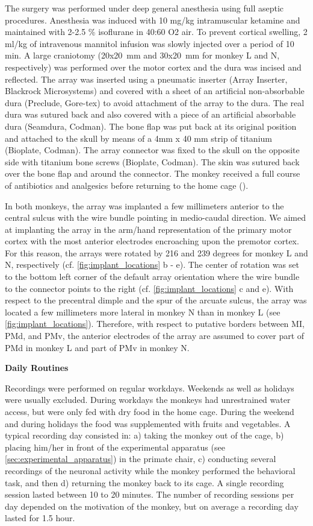 {The surgery was performed under deep general anesthesia using full aseptic procedures. Anesthesia was induced with 10 mg/kg intramuscular ketamine and maintained with 2-2.5 \% isoflurane in 40:60 O2 air. To prevent cortical swelling, 2 ml/kg of intravenous mannitol infusion was slowly injected over a period of 10 min. A large craniotomy (20x20 mm and 30x20 mm for monkey L and N, respectively) was performed over the motor cortex and the dura was incised and reflected. The array was inserted using a pneumatic inserter (Array Inserter, Blackrock Microsystems) and covered with a sheet of an artificial non-absorbable dura (Preclude, Gore-tex) to avoid attachment of the array to the dura. The real dura was sutured back and also covered with a piece of an artificial absorbable dura (Seamdura, Codman). The bone flap was put back at its original position and attached to the skull by means of a 4mm x 40 mm strip of titanium (Bioplate, Codman). The array connector was fixed to the skull on the opposite side with titanium bone screws (Bioplate, Codman). The skin was sutured back over the bone flap and around the connector. The monkey received a full course of antibiotics and analgesics before returning to the home cage (\cite{Riehle_2013}).

In both monkeys, the array was implanted a few millimeters anterior to the central sulcus with the wire bundle pointing in medio-caudal direction. We aimed at implanting the array in the arm/hand representation of the primary motor cortex with the most anterior electrodes encroaching upon the premotor cortex. For this reason, the arrays were rotated by 216 and 239 degrees for monkey L and N, respectively (cf. \cref{fig:implant_locations} b - e). The center of rotation was set to the bottom left corner of the default array orientation where the wire bundle to the connector points to the right (cf. \cref{fig:implant_locations} c and e). With respect to the precentral dimple and the spur of the arcuate sulcus, the array was located a few millimeters more lateral in monkey N than in monkey L (see \cref{fig:implant_locations}). Therefore, with respect to putative borders between MI, PMd, and PMv, the anterior electrodes of the array are assumed to cover part of PMd in monkey L and part of PMv in monkey N. 

\textbf{Daily Routines}

Recordings were performed on regular workdays. Weekends as well as holidays were usually excluded. During workdays the monkeys had unrestrained water access, but were only fed with dry food in the home cage. During the weekend and during holidays the food was supplemented with fruits and vegetables. A typical recording day consisted in: a) taking the monkey out of the cage, b) placing him/her in front of the experimental apparatus (see \cref{sec:experimental_apparatus}) in the primate chair, c) conducting several recordings of the neuronal activity while the monkey performed the behavioral task, and then d) returning the monkey back to its cage. A single recording session lasted between 10 to 20 minutes. The number of recording sessions per day depended on the motivation of the monkey, but on average a recording day lasted for 1.5 hour.

}
